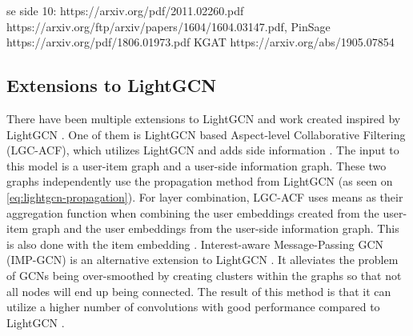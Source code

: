 se side 10: https://arxiv.org/pdf/2011.02260.pdf
https://arxiv.org/ftp/arxiv/papers/1604/1604.03147.pdf,
PinSage https://arxiv.org/pdf/1806.01973.pdf
KGAT https://arxiv.org/abs/1905.07854


\subsection{Extensions to LightGCN}
There have been multiple extensions to LightGCN and work created inspired by LightGCN \cite{LGC-ACF,IMP-GCN,SGNN,BiTGCF}.
One of them is LightGCN based Aspect-level Collaborative Filtering (LGC-ACF), which utilizes LightGCN and adds side information \cite{LGC-ACF}.
The input to this model is a user-item graph and a user-side information graph. 
These two graphs independently use the propagation method from LightGCN  (as seen on \autoref{eq:lightgcn-propagation}).
For layer combination, LGC-ACF uses means as their aggregation function when combining the user embeddings created from the user-item graph and the user embeddings from the user-side information graph.
This is also done with the item embedding \cite{LGC-ACF}.
Interest-aware Message-Passing GCN (IMP-GCN) is an alternative extension to LightGCN \cite{IMP-GCN}. 
It alleviates the problem of GCNs being over-smoothed by creating clusters within the graphs so that not all nodes will end up being connected.
The result of this method is that it can utilize a higher number of convolutions with good performance compared to LightGCN \cite{IMP-GCN}. 